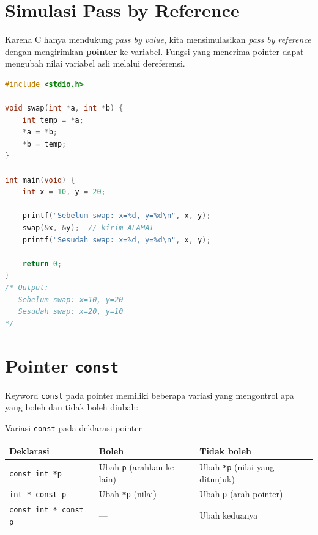 \documentclass[../main.tex]{subfiles}
\begin{document}
\section{Simulasi Pass by Reference}

Karena C hanya mendukung \textit{pass by value}, kita mensimulasikan \textit{pass by reference} dengan mengirimkan \textbf{pointer} ke variabel. Fungsi yang menerima pointer dapat mengubah nilai variabel asli melalui dereferensi.

\begin{lstlisting}[language=C,caption=Swap menggunakan pointer (pass by reference)]
#include <stdio.h>

void swap(int *a, int *b) {
    int temp = *a;
    *a = *b;
    *b = temp;
}

int main(void) {
    int x = 10, y = 20;
    
    printf("Sebelum swap: x=%d, y=%d\n", x, y);
    swap(&x, &y);  // kirim ALAMAT
    printf("Sesudah swap: x=%d, y=%d\n", x, y);
    
    return 0;
}
/* Output:
   Sebelum swap: x=10, y=20
   Sesudah swap: x=20, y=10
*/
\end{lstlisting}

\section{Pointer \texttt{const}}

Keyword \texttt{const} pada pointer memiliki beberapa variasi yang mengontrol apa yang boleh dan tidak boleh diubah:

\begin{modultable}[]{Variasi \texttt{const} pada deklarasi pointer}
\begin{tabular}{|l|p{4.5cm}|p{4.5cm}|}
\hline
\textbf{Deklarasi} & \textbf{Boleh} & \textbf{Tidak boleh} \\
\hline
\texttt{const int *p} & Ubah \texttt{p} (arahkan ke lain) & Ubah \texttt{*p} (nilai yang ditunjuk) \\
\hline
\texttt{int * const p} & Ubah \texttt{*p} (nilai) & Ubah \texttt{p} (arah pointer) \\
\hline
\texttt{const int * const p} & --- & Ubah keduanya \\
\hline
\end{tabular}
\end{modultable}
\end{document}
